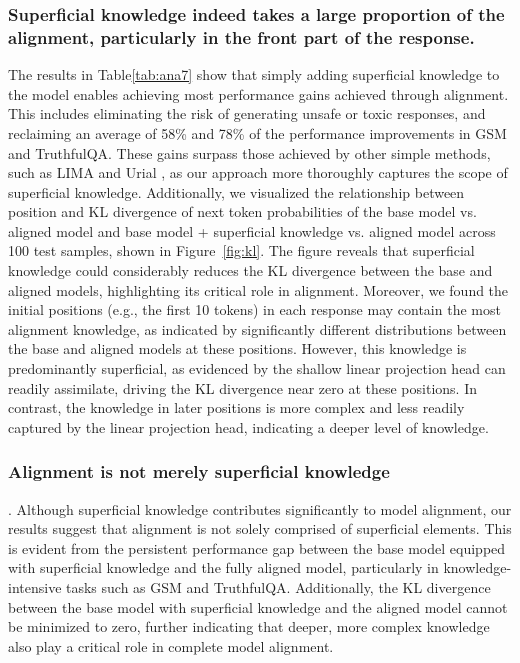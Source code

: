 \subsubsection{Superficial knowledge indeed takes a large proportion of the alignment, particularly in the front part of the response.} 
The results in Table\ref{tab:ana7} show that simply adding superficial knowledge to the model enables achieving  most performance gains achieved through alignment. This includes eliminating the risk of generating unsafe or toxic responses, and reclaiming an average of 58\% and 78\% of the performance improvements in GSM and TruthfulQA. These gains surpass those achieved by other simple methods, such as LIMA \cite{lima} and Urial \cite{urial}, as our approach more thoroughly captures the scope of superficial knowledge.
Additionally, 
we visualized the relationship between position and KL divergence of next token probabilities of the base model vs. aligned model and base model + superficial knowledge vs. aligned model across 100 test samples, shown in Figure~\ref{fig:kl}. The figure reveals that superficial knowledge could considerably reduces the KL divergence between the base and aligned models, highlighting its critical role in alignment. Moreover, we found the initial positions (e.g., the first 10 tokens) in each response may contain the most alignment knowledge, as indicated by significantly different distributions between the base and aligned models at these positions. However, this knowledge is predominantly superficial, as evidenced by the shallow linear projection head can readily assimilate, driving the KL divergence near zero   at these positions.  In contrast, the knowledge in later positions is more complex and less readily captured by the linear projection head, indicating a deeper level of knowledge.


\subsubsection{Alignment is not merely superficial knowledge}. Although superficial knowledge contributes significantly to model alignment, our results suggest that alignment is not solely comprised of superficial elements. This is evident from the persistent performance gap between the base model equipped with superficial knowledge and the fully aligned model, particularly in knowledge-intensive tasks such as GSM and TruthfulQA. Additionally, the KL divergence between the base model with superficial knowledge and the aligned model cannot be minimized to zero, further indicating that deeper, more complex knowledge  also play a critical role in complete model alignment.

